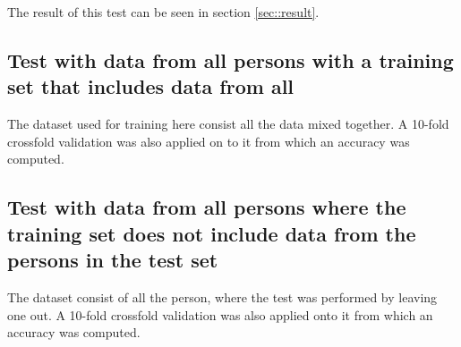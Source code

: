 The result of this test can be seen in section  \ref{sec::result}. 

\subsection{Test with data from all persons with a training set that includes 
data from all}

The dataset used for training here consist all the data mixed together. A 10-fold crossfold validation was also applied on to it from which an accuracy was computed. 



\subsection{Test with data from all persons where the training set does not 
include data from 
the persons in the test set}

The dataset consist of all the person, where the test was performed by leaving one out. A 10-fold crossfold validation was also applied onto it from which an accuracy was computed. 





